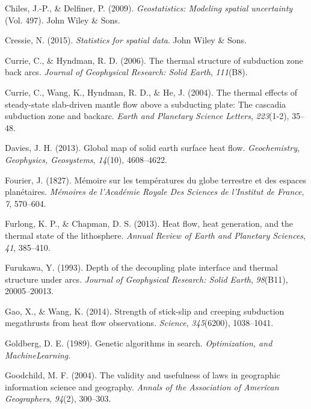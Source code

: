 \documentclass[draft,linenumbers]{agujournal2018}
\begin{document}
\leavevmode{}%
Chiles, J.-P., \& Delfiner, P. (2009). \emph{Geostatistics: Modeling
spatial uncertainty} (Vol. 497). John Wiley \& Sons.

\leavevmode{}%
Cressie, N. (2015). \emph{Statistics for spatial data}. John Wiley \&
Sons.

\leavevmode{}%
Currie, C., \& Hyndman, R. D. (2006). The thermal structure of
subduction zone back arcs. \emph{Journal of Geophysical Research: Solid
Earth}, \emph{111}(B8).

\leavevmode{}%
Currie, C., Wang, K., Hyndman, R. D., \& He, J. (2004). The thermal
effects of steady-state slab-driven mantle flow above a subducting
plate: The cascadia subduction zone and backarc. \emph{Earth and
Planetary Science Letters}, \emph{223}(1-2), 35--48.

\leavevmode{}%
Davies, J. H. (2013). Global map of solid earth surface heat flow.
\emph{Geochemistry, Geophysics, Geosystems}, \emph{14}(10), 4608--4622.

\leavevmode{}%
Fourier, J. (1827). M{é}moire sur les temp{é}ratures du globe terrestre
et des espaces plan{é}taires. \emph{M{é}moires de l'Acad{é}mie Royale
Des Sciences de l'Institut de France}, \emph{7}, 570--604.

\leavevmode{}%
Furlong, K. P., \& Chapman, D. S. (2013). Heat flow, heat generation,
and the thermal state of the lithosphere. \emph{Annual Review of Earth
and Planetary Sciences}, \emph{41}, 385--410.

\leavevmode{}%
Furukawa, Y. (1993). Depth of the decoupling plate interface and thermal
structure under arcs. \emph{Journal of Geophysical Research: Solid
Earth}, \emph{98}(B11), 20005--20013.

\leavevmode{}%
Gao, X., \& Wang, K. (2014). Strength of stick-slip and creeping
subduction megathrusts from heat flow observations. \emph{Science},
\emph{345}(6200), 1038--1041.

\leavevmode{}%
Goldberg, D. E. (1989). Genetic algorithms in search.
\emph{Optimization, and MachineLearning}.

\leavevmode{}%
Goodchild, M. F. (2004). The validity and usefulness of laws in
geographic information science and geography. \emph{Annals of the
Association of American Geographers}, \emph{94}(2), 300--303.
\end{document}
